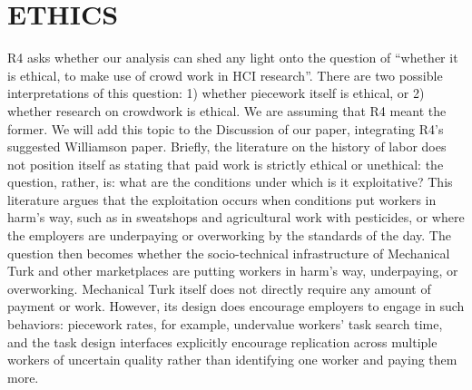 \documentclass[11pt]{article}
\begin{document}
\section{ETHICS}
R4 asks whether our analysis can shed any light onto the question of ``whether it is ethical, to make use of crowd work in HCI research''.
There are two possible interpretations of this question: 1) whether piecework itself is ethical, or 2) whether research on crowdwork is ethical. 
We are assuming that R4 meant the former.
We will add this topic to the Discussion of our paper, integrating R4's suggested Williamson paper.
Briefly, the literature on the history of labor does not position itself as stating that paid work is strictly ethical or unethical: the question, rather, is: what are the conditions under which is it exploitative?
This literature argues that the exploitation occurs when conditions put workers in harm's way, such as in sweatshops and agricultural work with pesticides, or where the employers are underpaying or overworking by the standards of the day.
The question then becomes whether the socio-technical infrastructure of Mechanical Turk and other marketplaces are putting workers in harm's way, underpaying, or overworking.
Mechanical Turk itself does not directly require any amount of payment or work.
However, its design does encourage employers to engage in such behaviors: piecework rates, for example, undervalue workers' task search time, and the task design interfaces explicitly encourage replication across multiple workers of uncertain quality rather than identifying one worker and paying them more.








\printbibliography{}
\end{document}
